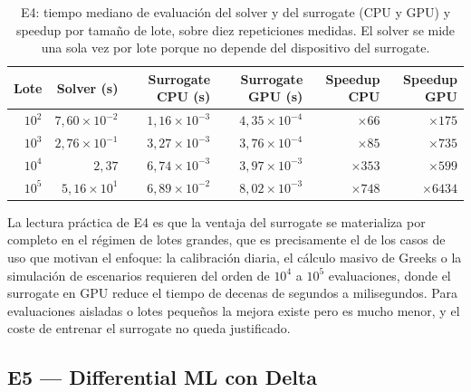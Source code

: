 \documentclass[11pt,a4paper]{article}
\begin{document}
\begin{table}[H]
\centering
\small
\renewcommand{\arraystretch}{1.15}
\begin{tabular}{r r r r r r}
\toprule
Lote & Solver (s) & Surrogate CPU (s) & Surrogate GPU (s) & Speedup CPU & Speedup GPU \\
\midrule
$10^2$ & $7{,}60\times 10^{-2}$ & $1{,}16\times 10^{-3}$ & $4{,}35\times 10^{-4}$ & $\times 66$   & $\times 175$  \\
$10^3$ & $2{,}76\times 10^{-1}$ & $3{,}27\times 10^{-3}$ & $3{,}76\times 10^{-4}$ & $\times 85$   & $\times 735$  \\
$10^4$ & $2{,}37$               & $6{,}74\times 10^{-3}$ & $3{,}97\times 10^{-3}$ & $\times 353$  & $\times 599$  \\
$10^5$ & $5{,}16\times 10^{1}$  & $6{,}89\times 10^{-2}$ & $8{,}02\times 10^{-3}$ & $\times 748$  & $\times 6434$ \\
\bottomrule
\end{tabular}
\caption{E4: tiempo mediano de evaluación del solver y del surrogate (CPU y GPU) y speedup por tamaño de lote, sobre diez repeticiones medidas. El solver se mide una sola vez por lote porque no depende del dispositivo del surrogate.}
\label{tab:e4}
\end{table}

La lectura práctica de E4 es que la ventaja del surrogate se materializa por completo en el régimen de lotes grandes, que es precisamente el de los casos de uso que motivan el enfoque: la calibración diaria, el cálculo masivo de Greeks o la simulación de escenarios requieren del orden de $10^4$ a $10^5$ evaluaciones, donde el surrogate en GPU reduce el tiempo de decenas de segundos a milisegundos. Para evaluaciones aisladas o lotes pequeños la mejora existe pero es mucho menor, y el coste de entrenar el surrogate no queda justificado.

\subsection{E5 --- Differential ML con Delta}\label{sec:res-e5}
\end{document}
